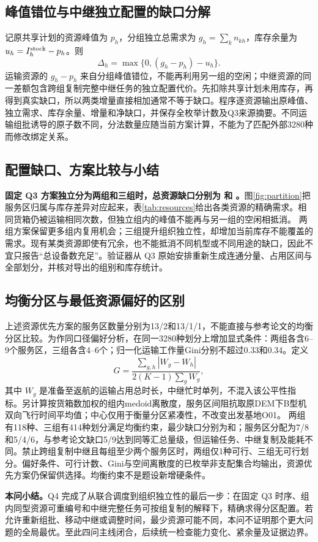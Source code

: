 \subsection{峰值错位与中继独立配置的缺口分解}
记原共享计划的资源峰值为 $p_h$，分组独立总需求为 $g_h=\sum_kn_{kh}$，库存余量为 $u_h=I_h^{\rm stock}-p_h$。则
\begin{equation}
\Delta_h=\max\{0,(g_h-p_h)-u_h\}.
\end{equation}
运输资源的 $g_h-p_h$ 来自分组峰值错位，不能再利用另一组的空闲；中继资源的同一差额包含跨组复制完整中继任务的独立配置代价。先扣除共享计划未用库存，再得到真实缺口，所以两类增量直接相加通常不等于缺口。程序逐资源输出原峰值、独立需求、库存余量、增量和净缺口，并保存全枚举计数及Q3来源摘要。不同运输组批诱导的原子数不同，分法数量应随当前方案计算，不能为了匹配外部3280种而修改绑定关系。

\subsection{配置缺口、方案比较与小结}
\textbf{固定 Q3 方案独立分为两组和三组时，总资源缺口分别为 \GapTwo{} 和 \GapThree{}。}图\ref{fig:partition}把服务区归属与库存差异对应起来，表\ref{tab:resources}给出各类资源的精确需求。相同货箱仍被运输相同次数，但独立组内的峰值不能再与另一组的空闲相抵消。
两组方案保留更多组内复用机会；三组提升组织独立性，却增加当前库存不能覆盖的需求。现有某类资源即使有冗余，也不能抵消不同机型或不同用途的缺口，因此不宜只报告“总设备数充足”。验证器从 Q3 原始安排重新生成连通分量、占用区间与全部划分，并核对导出的组别和库存统计。

\subsection{均衡分区与最低资源偏好的区别}
上述资源优先方案的服务区数量分别为13/2和13/1/1，不能直接与参考论文的均衡分区比较。为作同口径偏好分析，在同一3280种划分上增加显式条件：两组各含6--9个服务区，三组各含4--6个；归一化运输工作量Gini分别不超过0.33和0.34。定义
\begin{equation}
G=\frac{\sum_{g,h}|W_g-W_h|}{2(K-1)\sum_gW_g},
\end{equation}
其中 $W_g$ 是准备至返航的运输占用总时长，中继忙时单列，不混入该公平性指标。另计算按货箱数加权的组内medoid离散度，服务区间阻抗取原DEM下B型机双向飞行时间平均值；中心仅用于衡量分区紧凑性，不改变出发基地O01。
两组有118种、三组有414种划分满足均衡约束，最少缺口分别为\BalancedGapTwo{}和\BalancedGapThree{}；服务区分配为7/8和5/4/6，与参考论文缺口5/9达到同等汇总量级，但运输任务、中继复制及能耗不同。禁止跨组复制中继且每组至少两个服务区时，两组仅1种可行、三组无可行划分。偏好条件、可行计数、Gini与空间离散度的已枚举非支配集合均输出，资源优先方案仍保留供选择。均衡约束不是题设新增硬条件。

\textbf{本问小结。}Q4 完成了从联合调度到组织独立性的最后一步：在固定 Q3 时序、组内同型资源可重编号和中继完整任务可按组复制的解释下，精确求得分区配置。若允许重新组批、移动中继或调整时间，最少资源可能不同，本问不证明那个更大问题的全局最优。至此四问主线闭合，后续统一检查能力变化、紧余量及证据边界。
\FloatBarrier
